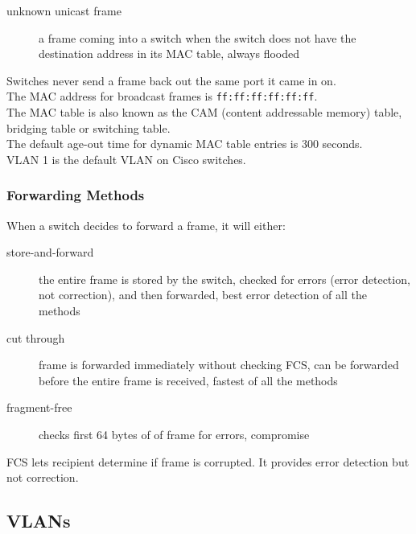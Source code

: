 \begin{description}

\item[unknown unicast frame]
a frame coming into a switch when the switch does not have the destination
address in its MAC table, always flooded

\end{description}

Switches never send a frame back out the same port it came in on.\\

The MAC address for broadcast frames is \texttt{ff:ff:ff:ff:ff:ff}.\\

The MAC table is also known as the CAM (content addressable memory) table,
bridging table or switching table.\\

The default age-out time for dynamic MAC table entries is 300 seconds.\\

VLAN 1 is the default VLAN on Cisco switches.

\subsubsection{Forwarding Methods}

When a switch decides to forward a frame, it will either:

\begin{description}

\item[store-and-forward]
the entire frame is stored by the switch, checked for errors (error detection,
not correction), and then forwarded, best error detection of all the methods

\item[cut through]
frame is forwarded immediately without checking FCS, can be forwarded before
the entire frame is received, fastest of all the methods

\item[fragment-free]
checks first 64 bytes of of frame for errors, compromise


\end{description}

FCS lets recipient determine if frame is corrupted. It provides error
detection but not correction.

\subsection{VLANs}

